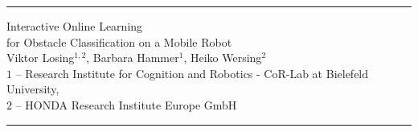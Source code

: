\documentclass{article}
\begin{document}

\rule{\linewidth}{1pt}
\vspace*{1in}

\begin{center}
{%
\fontsize{2.4cm}{2.4cm}\sffamily
Interactive Online Learning \\for Obstacle
Classification on a Mobile Robot
\\[5mm]
\fontsize{1.3cm}{1.3cm}\sffamily%
Viktor Losing$^{1,2}$, Barbara Hammer$^1$, Heiko Wersing$^{2}$ \\[5mm]
\fontsize{1.3cm}{1.3cm}\sffamily%
$1$ -- Research Institute for Cognition and Robotics - CoR-Lab at Bielefeld University,\\  $2$ -- HONDA Research Institute Europe GmbH\\
\vspace*{1in}
\rule{\linewidth}{1pt}
\fontsize{8mm}{9mm}\sffamily}
\end{center}
\end{document}
